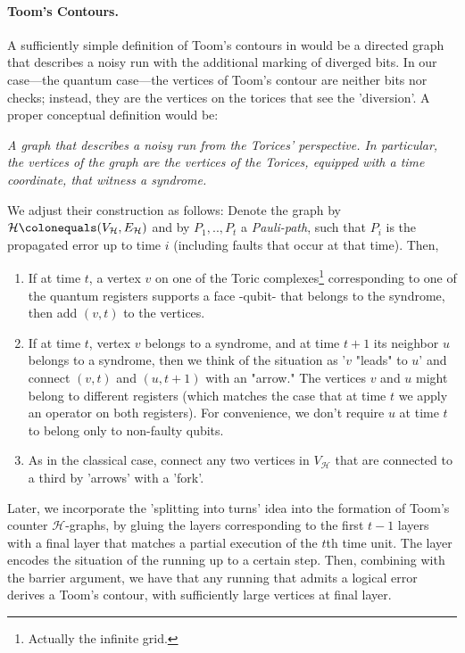 \paragraph{Toom's Contours.} 
A sufficiently simple definition of Toom's contours in \cite{Berman} would be a directed graph that describes a noisy run with the additional marking of diverged bits. In our case—the quantum case—the vertices of Toom's contour are neither bits nor checks; instead, they are the vertices on the torices that see the 'diversion'. A proper conceptual definition would be:
\begin{center}
\begin{minipage}{0.75\textwidth}
  \textit{
A graph that describes a noisy run from the Torices' perspective. In particular, the vertices of the graph are the vertices of the Torices, equipped with a time coordinate, that witness a syndrome.
  }
\end{minipage}
\end{center}
We adjust their construction as follows: Denote the graph by $\mathcal{H} \colonequals (V_{\mathcal{H}}, E_{\mathcal{H}})$ and by $P_{1},..,P_{t}$ a \textit{Pauli-path}, such that $P_{i}$ is the propagated error up to time $i$ (including faults that occur at that time). Then,
\begin{enumerate}
  \item  If at time $t$, a vertex $v$ on one of the Toric complexes\footnote{Actually the infinite grid.} corresponding to one of the quantum registers supports a face -qubit- that belongs to the syndrome, then add $(v,t)$ to the vertices.
  \item If at time $t$, vertex $v$ belongs to a syndrome, and at time $t+1$ its neighbor $u$ belongs to a syndrome, then we think of the situation as '$v$ "leads" to $u$' and connect $(v,t)$ and $(u,t+1)$ with an "arrow." The vertices $v$ and $u$ might belong to different registers (which matches the case that at time $t$ we apply an operator on both registers). For convenience, we don't require $u$ at time $t$ to belong only to non-faulty qubits.
  \item As in the classical case, connect any two vertices in $V_{\mathcal{H}}$ that are connected to a third by 'arrows' with a 'fork'.
\end{enumerate}


Later, we incorporate the 'splitting into turns' idea into the formation of Toom's counter $\mathcal{H}$-graphs, by gluing the layers corresponding to the first $t-1$ layers with a final layer that matches a partial execution of the $t$th time unit. The layer encodes the situation of the running up to a certain step. Then, combining with the barrier argument, we have that any running that admits a logical error derives a Toom's contour, with sufficiently large vertices at final layer. 


